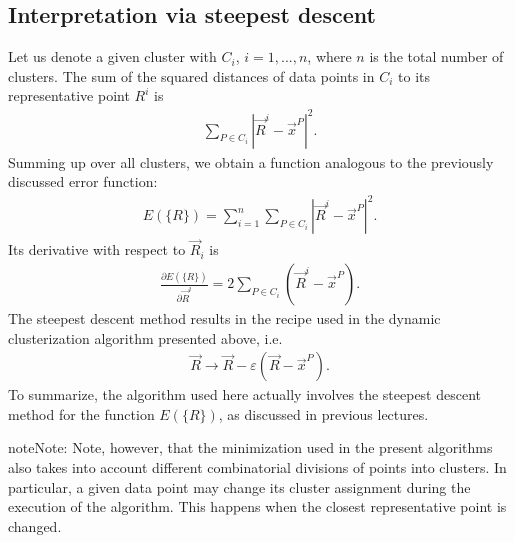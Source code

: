 \documentclass[letterpaper,10pt,english]{jupyterBook}
\begin{document}
\subsection{Interpretation via steepest descent}
\label{\detokenize{docs/unsupervised:interpretation-via-steepest-descent}}
\sphinxAtStartPar
Let us denote a given cluster with \(C_i\), \(i = 1, ..., n\), where \( n \) is the total number of clusters. The sum of the squared distances of data points in \( C_i \) to its representative point \( R ^ i \) is
\begin{equation*}
\begin{split}
\sum_{P \in C_i} | \vec{R}^i- \vec{x}^P|^2.
\end{split}
\end{equation*}
\sphinxAtStartPar
Summing up over all clusters, we obtain a function analogous to the previously discussed error function:
\begin{equation*}
\begin{split}E (\{R \}) = \sum_{i = 1}^ n \sum_ {P \in C_i} |\vec{R}^i- \vec{x}^P |^2 .\end{split}
\end{equation*}
\sphinxAtStartPar
Its derivative with respect to \( \vec{R}_i \) is
\begin{equation*}
\begin{split} \frac{\partial E (\{R \})}{\partial \vec{R}^i}
= 2 \sum_{P \in C_i} (\vec{R}^i- \vec{x}^P). \end{split}
\end{equation*}
\sphinxAtStartPar
The steepest descent method results  in the recipe used in the
dynamic clusterization algorithm presented above, i.e.
\begin{equation*}
\begin{split} \vec{R} \to \vec{R} - \varepsilon (\vec{R} - \vec {x}^P). \end{split}
\end{equation*}
\sphinxAtStartPar
To summarize, the algorithm used here actually involves the steepest descent method for the function \( E (\{R \})\), as discussed in previous lectures.

\begin{sphinxadmonition}{note}{Note:}
\sphinxAtStartPar
Note, however, that the minimization used in the present algorithms also takes into account different combinatorial divisions of points into clusters. In particular, a given data point may change its cluster assignment during the execution of the algorithm. This happens when the closest representative point is changed.
\end{sphinxadmonition}
\end{document}
